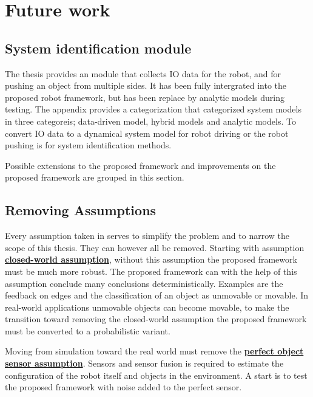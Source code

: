 \section{Future work}%
\label{sec:future_work}

\subsection{System identification module}
The thesis provides an module that collects \ac{IO} data for the robot, and for pushing an object from multiple sides. It has been fully intergrated into the proposed robot framework, but has been replace by analytic models during testing. The appendix provides a categorization that categorized system models in three categoreis; data-driven model, hybrid models and analytic models.  To convert \ac{IO} data to a dynamical system model for robot driving or the robot pushing is for system identification methods. 


Possible extensions to the proposed framework and improvements on the proposed framework are grouped in this section.\bs
{}


\subsection{Removing Assumptions}
Every assumption taken in  serves to simplify the problem and to narrow the scope of this thesis. They can however all be removed. Starting with assumption \hyperref[assumption:closed_world]{\textbf{closed-world assumption}}, without this assumption the proposed framework must be much more robust. The proposed framework can with the help of this assumption conclude many conclusions deterministically. Examples are the feedback on edges and the classification of an object as unmovable or movable. In real-world applications unmovable objects can become movable, to make the transition toward removing the closed-world assumption the proposed framework must be converted to a probabilistic variant.\bs

Moving from simulation toward the real world must remove the \hyperref[assumption:perfect_object_sensor]{\textbf{perfect object sensor assumption}}. Sensors and sensor fusion is required to estimate the configuration of the robot itself and objects in the environment. A start is to test the proposed framework with noise added to the perfect sensor.\bs

